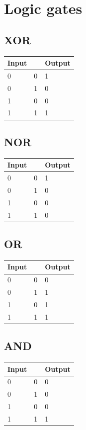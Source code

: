 \documentclass[a4paper, 10pt]{article}
\begin{document}
\section{Logic gates}
\subsection{XOR}
\begin{tabular}{|l|l|l|}
    \hline
    Input & ~ & Output \\ \hline
    0     & 0 & 1      \\ \hline
    0     & 1 & 0      \\ \hline
    1     & 0 & 0      \\ \hline
    1     & 1 & 1      \\ \hline
\end{tabular}

\subsection{NOR}
\begin{tabular}{|l|l|l|}
    \hline
    Input & ~ & Output \\ \hline
    0     & 0 & 1      \\ \hline
    0     & 1 & 0      \\ \hline
    1     & 0 & 0      \\ \hline
    1     & 1 & 0      \\ \hline
\end{tabular}

\subsection{OR}
\begin{tabular}{|l|l|l|}
    \hline
    Input & ~ & Output \\ \hline
    0     & 0 & 0      \\ \hline
    0     & 1 & 1      \\ \hline
    1     & 0 & 1      \\ \hline
    1     & 1 & 1      \\ \hline
\end{tabular}

\subsection{AND}
\begin{tabular}{|l|l|l|}
    \hline
    Input & ~ & Output \\ \hline
    0     & 0 & 0      \\ \hline
    0     & 1 & 0      \\ \hline
    1     & 0 & 0      \\ \hline
    1     & 1 & 1      \\ \hline
\end{tabular}
    
\end{document}
